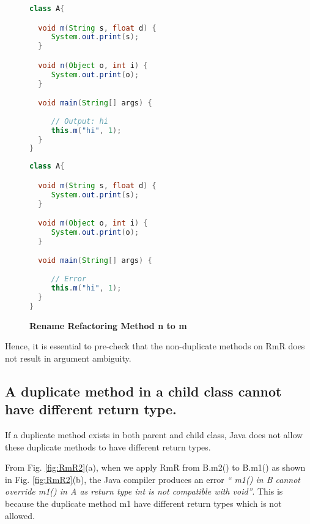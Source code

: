 \begin{figure}[th]
\centering
\begin{minipage}[t]{0.48\linewidth}
\begin{lstlisting}[language=java, basicstyle=\scriptsize\ttfamily,frame=single]
class A{

  void m(String s, float d) {
     System.out.print(s); 
  }

  void n(Object o, int i) {
     System.out.print(o);
  }

  void main(String[] args) {
	
     // Output: hi
     this.m("hi", 1);
  }
}
\end{lstlisting}
\end{minipage}
\hfill
\begin{minipage}[t]{0.48\linewidth}
\begin{lstlisting}[language=java, basicstyle=\scriptsize\ttfamily,frame=single]
class A{

  void m(String s, float d) {
     System.out.print(s); 
  }

  void m(Object o, int i) {
     System.out.print(o);
  }

  void main(String[] args) {
  
     // Error
     this.m("hi", 1);
  }
}

\end{lstlisting}
\end{minipage}
\caption{\textbf{Rename Refactoring Method n to m}}
\label{fig:RmR5}
\end{figure}

Hence, it is essential to pre-check that the non-duplicate methods on RmR does not result in argument ambiguity.

\subsection{A duplicate method in a child class cannot have different return type.}

If a duplicate method exists in both parent and child class, Java does not allow these duplicate methods to have different return types.

From Fig. \ref{fig:RmR2}(a), when we apply RmR from B.m2() to B.m1() as shown in Fig. \ref{fig:RmR2}(b), the Java compiler produces an error \textsl{`` m1() in B cannot override m1() in A as return type int is not compatible with void''}. This is because the duplicate method m1 have different return types which is not allowed. 

